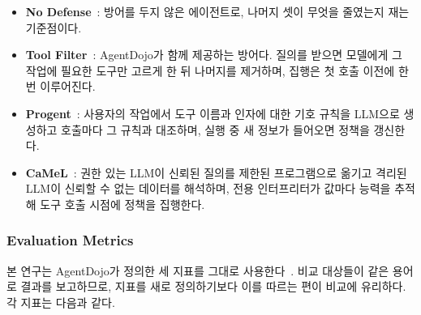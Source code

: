 \documentclass[acmsmall,screen,review,anonymous]{acmart}
\begin{document}
\begin{itemize}
    \item \textbf{No Defense}~\cite{debenedetti2024agentdojo}: 방어를 두지 않은 에이전트로, 나머지 셋이 무엇을 줄였는지 재는 기준점이다.
    \item \textbf{Tool Filter}~\cite{debenedetti2024agentdojo}: AgentDojo가 함께 제공하는 방어다. 질의를 받으면 모델에게 그 작업에 필요한 도구만 고르게 한 뒤 나머지를 제거하며, 집행은 첫 호출 이전에 한 번 이루어진다.
    \item \textbf{Progent}~\cite{shi2025progent}: 사용자의 작업에서 도구 이름과 인자에 대한 기호 규칙을 LLM으로 생성하고 호출마다 그 규칙과 대조하며, 실행 중 새 정보가 들어오면 정책을 갱신한다.
    \item \textbf{CaMeL}~\cite{debenedetti2025defeating}: 권한 있는 LLM이 신뢰된 질의를 제한된 프로그램으로 옮기고 격리된 LLM이 신뢰할 수 없는 데이터를 해석하며, 전용 인터프리터가 값마다 능력을 추적해 도구 호출 시점에 정책을 집행한다.
\end{itemize}

\subsubsection{Evaluation Metrics}

본 연구는 AgentDojo가 정의한 세 지표를 그대로 사용한다~\cite{debenedetti2024agentdojo}. 비교 대상들이 같은 용어로 결과를 보고하므로, 지표를 새로 정의하기보다 이를 따르는 편이 비교에 유리하다. 각 지표는 다음과 같다.
\end{document}
